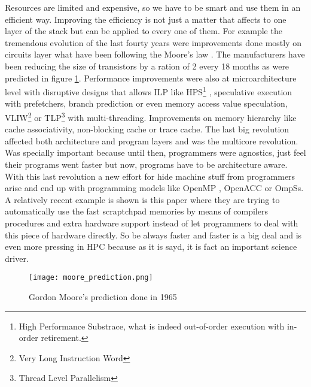 Resources are limited and expensive, so we have to be smart and use them in an
efficient way. Improving the efficiency is not just a matter that affects to one
layer of the stack but can be applied to every one of them. For example the
tremendous evolution of the last fourty years were improvements done mostly on
circuits layer what have been following the Moore's law \cite{moore:1965}. The
manufacturers have been reducing the size of transistors by a ration of 2 every
18 months as were predicted in figure \ref{moore-prediction}. Performance improvements 
were also at microarchitecture level with
disruptive designs that allows ILP like HPS\footnote{High Performance Substrace,
what is indeed out-of-order execution with in-order retirement.}
\cite{Patt:1985:HNM:18927.18916}, speculative execution with prefetchers, 
branch prediction or even memory access value speculation,
VLIW\footnote{Very Long Instruction Word} or TLP\footnote{Thread Level
Parallelism} with multi-threading. Improvements on memory hierarchy like cache 
associativity, non-blocking cache or trace cache. The last
big revolution affected both architecture and program layers and was the 
multicore revolution. Was specially important because until then, programmers were 
agnostics, just feel their programs went faster but now, programs have to be 
architecture aware. With this last revolution a new effort for hide machine stuff
from programmers arise and end up with programming models like OpenMP
\cite{openmp_new}, OpenACC\cite{openacc_new} or OmpSs\cite{ompss_new}. A relatively
recent example is shown is this paper \cite{Alvarez:2015:CPT:2872887.2750411}
where they are trying to automatically use the fast scraptchpad memories by
means of compilers procedures and extra hardware support instead
of let programmers to deal with this piece of hardware directly. So be 
always faster and faster is a big deal and is even more pressing in HPC because 
as it is sayd, it is fact an important science driver.

\begin{figure}
  \caption{Gordon Moore's prediction done in 1965}
  \label{moore-prediction}
  \centering
    \texttt{[image: moore\_prediction.png]}
\end{figure}


